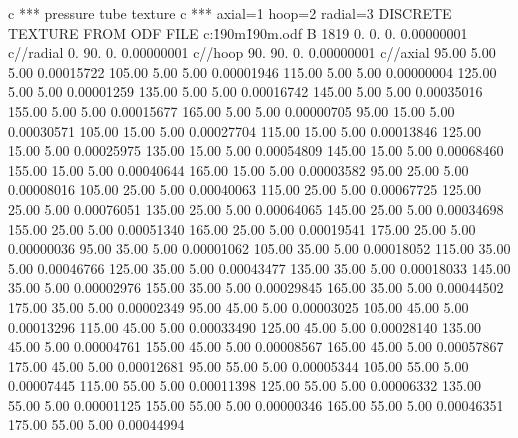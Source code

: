 c *** pressure tube texture
c ***  axial=1  hoop=2   radial=3
DISCRETE TEXTURE FROM ODF FILE  c:\textures\zrtube\h190m\h190m.odf
B    1819
      0.        0.        0.       0.00000001      c//radial
      0.       90.        0.       0.00000001      c//hoop
     90.       90.        0.       0.00000001      c//axial
     95.00      5.00      5.00     0.00015722
    105.00      5.00      5.00     0.00001946
    115.00      5.00      5.00     0.00000004
    125.00      5.00      5.00     0.00001259
    135.00      5.00      5.00     0.00016742
    145.00      5.00      5.00     0.00035016
    155.00      5.00      5.00     0.00015677
    165.00      5.00      5.00     0.00000705
     95.00     15.00      5.00     0.00030571
    105.00     15.00      5.00     0.00027704
    115.00     15.00      5.00     0.00013846
    125.00     15.00      5.00     0.00025975
    135.00     15.00      5.00     0.00054809
    145.00     15.00      5.00     0.00068460
    155.00     15.00      5.00     0.00040644
    165.00     15.00      5.00     0.00003582
     95.00     25.00      5.00     0.00008016
    105.00     25.00      5.00     0.00040063
    115.00     25.00      5.00     0.00067725
    125.00     25.00      5.00     0.00076051
    135.00     25.00      5.00     0.00064065
    145.00     25.00      5.00     0.00034698
    155.00     25.00      5.00     0.00051340
    165.00     25.00      5.00     0.00019541
    175.00     25.00      5.00     0.00000036
     95.00     35.00      5.00     0.00001062
    105.00     35.00      5.00     0.00018052
    115.00     35.00      5.00     0.00046766
    125.00     35.00      5.00     0.00043477
    135.00     35.00      5.00     0.00018033
    145.00     35.00      5.00     0.00002976
    155.00     35.00      5.00     0.00029845
    165.00     35.00      5.00     0.00044502
    175.00     35.00      5.00     0.00002349
     95.00     45.00      5.00     0.00003025
    105.00     45.00      5.00     0.00013296
    115.00     45.00      5.00     0.00033490
    125.00     45.00      5.00     0.00028140
    135.00     45.00      5.00     0.00004761
    155.00     45.00      5.00     0.00008567
    165.00     45.00      5.00     0.00057867
    175.00     45.00      5.00     0.00012681
     95.00     55.00      5.00     0.00005344
    105.00     55.00      5.00     0.00007445
    115.00     55.00      5.00     0.00011398
    125.00     55.00      5.00     0.00006332
    135.00     55.00      5.00     0.00001125
    155.00     55.00      5.00     0.00000346
    165.00     55.00      5.00     0.00046351
    175.00     55.00      5.00     0.00044994
